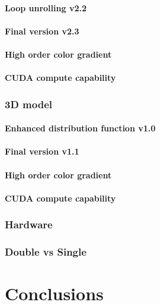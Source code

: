 \documentclass[12pt]{book}
\begin{document}
\subsubsection{Loop unrolling v2.2}
\subsubsection{Final version v2.3}
\subsubsection{High order color gradient}
\subsubsection{CUDA compute capability}
\subsection{3D model}
\subsubsection{Enhanced distribution function v1.0}
\subsubsection{Final version v1.1}
\subsubsection{High order color gradient}
\subsubsection{CUDA compute capability}
\subsection{Hardware}
\subsection{Double vs Single}
\chapter{Conclusions}

%

\appendix

{}

\end{document}
